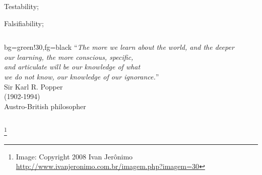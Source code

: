 \documentclass[t]{beamer}
\begin{document}
\begin{ftst}
\bitems Testability;
	\item Falsifiability;
\eitem
\vone
\begin{columns}[T]
	\begin{colorblock}{}{bg=green!30,fg=black}
	``\textit{The more we learn about the world, and the deeper\\
	our learning, the more conscious, specific,\\
	and articulate will be our knowledge of what\\
	we do not know, our knowledge of our ignorance.}''\\
	\flushright\vspace{-1em}\small Sir Karl R. Popper\\
	\flushright\vspace{-1em}\small (1902-1994)\\
	\flushright\vspace{-1em}\small Austro-British philosopher
	\end{colorblock}
\end{columns}
\let\thefootnote\relax\footnote{\tiny Image: Copyright 2008 Ivan Jer\^onimo \url{http://www.ivanjeronimo.com.br/imagem.php?imagem=30}}
\end{ftst}
\end{document}

